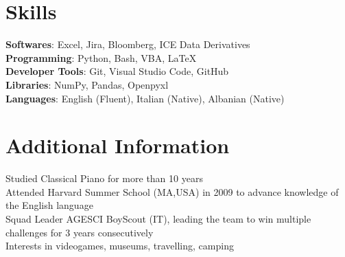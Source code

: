 \documentclass[letterpaper,11pt]{article}
\begin{document}
\section{Skills}
 \begin{itemize}[leftmargin=0.15in, label={}]
    \small{\item{
     \textbf{Softwares}{: Excel, Jira, Bloomberg, ICE Data Derivatives} \\
     \textbf{Programming}{: Python, Bash, VBA, \LaTeX} \\
     \textbf{Developer Tools}{: Git, Visual Studio Code, GitHub} \\
     \textbf{Libraries}{: NumPy, Pandas, Openpyxl} \\
     \textbf{Languages}{: English (Fluent), Italian (Native), Albanian (Native)}
    }}
 \end{itemize}

\section{Additional Information}
\begin{itemize}[leftmargin=0.15in, label={}]
   \small{\item{
    {Studied Classical Piano for more than 10 years} \\
    {Attended Harvard Summer School (MA,USA) in 2009 to advance knowledge of the English language} \\
    {Squad Leader AGESCI BoyScout (IT), leading the team to win multiple challenges for 3 years consecutively} \\
    {Interests in videogames, museums, travelling, camping}
   }} 
\end{itemize}
\end{document}

